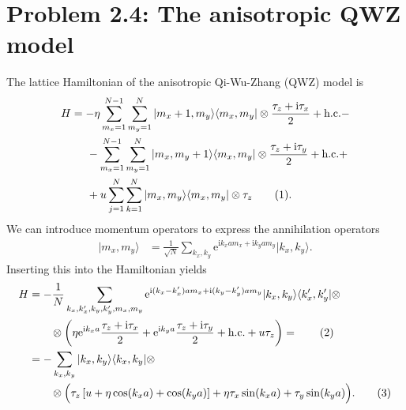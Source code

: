 \documentclass[english, parskip=full]{scrartcl}
\newcommand\numberthis{\addtocounter{equation}{1}\tag{\theequation}}
\newcommand{\kla}{}
\newcommand{\klam}{}
\newcommand{\oper}{}
\newcommand{\tecxt}{}
\newcommand{\Ket}{}
\renewcommand{\i}{\text{i}}
\newcommand{\e}{\text{e}}
\begin{document}
\section*{Problem 2.4: The anisotropic QWZ model}
The lattice Hamiltonian of the anisotropic Qi-Wu-Zhang (QWZ) model is 
\begin{align*}
H &= -\eta\sum_{m_x=1}^{N-1}\sum_{m_y=1}^N\oper | m_x+1,m_y \rangle\langle m_x,m_y |\otimes\frac{\tau_z + \i\tau_x}{2} + \tecxt\text{h.c.} - \\
&\hspace{0.5cm} - \sum_{m_x=1}^{N-1}\sum_{m_y=1}^N\oper | m_x,m_y+1 \rangle\langle m_x,m_y |\otimes\frac{\tau_z + \i\tau_y}{2} + \tecxt\text{h.c.} + \\
&\hspace{0.5cm} + u\sum_{j=1}^{N}\sum_{k=1}^N\oper | m_x,m_y \rangle\langle m_x,m_y |\otimes\tau_z \numberthis.
\end{align*}
We can introduce momentum operators to express the annihilation operators
\begin{align}
\Ket | m_x,m_y \rangle &= \frac{1}{\sqrt{N}}\sum_{k_x,k_y} \e^{\i k_x a m_x + \i k_y am_y}\Ket | k_x,k_y \rangle.
\end{align}
Inserting this into the Hamiltonian yields
\begin{align*}
H &= -\frac{1}{N}\sum_{k_x,k_x',k_y,k_y',m_x,m_y}\e^{\i (k_x-k_x') a m_x + \i (k_y-k_y') am_y}\oper | k_x,k_y \rangle\langle k_x',k_y' |\otimes\\
&\hspace{0.7cm} \otimes \kla\left( \eta\e^{\i k_xa}\frac{\tau_z + \i\tau_x}{2} + \e^{\i k_ya}\frac{\tau_z + \i\tau_y}{2} + \tecxt\text{h.c.} + u\tau_z\right) =  \numberthis\\
&= -\sum_{k_x,k_y} \oper | k_x,k_y \rangle\langle k_x,k_y | \otimes\\
&\hspace{0.7cm}  \otimes \kla\Big( \tau_z\klam\left[ u + \eta\cos(k_xa) + \cos(k_ya) \right] + \eta\tau_x\sin(k_xa) + \tau_y\sin(k_ya) \Big). \numberthis
\end{align*}
\end{document}
